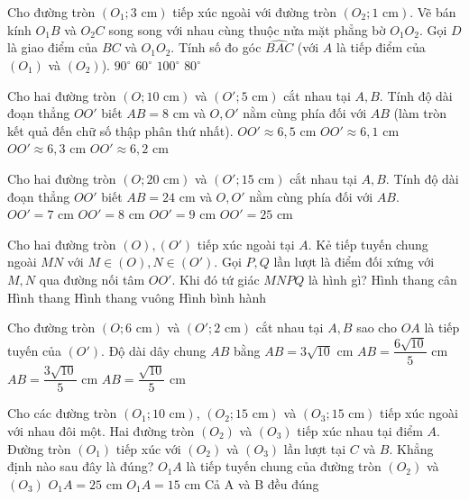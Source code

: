 \documentclass[11pt,a4paper]{article}
\begin{document}
\begin{ex}
Cho đường tròn $(O_1; 3\text{ cm})$ tiếp xúc ngoài với đường tròn $(O_2; 1\text{ cm})$. Vẽ bán kính $O_1B$ và $O_2C$ song song với nhau cùng thuộc nửa mặt phẳng bờ $O_1O_2$. Gọi $D$ là giao điểm của $BC$ và $O_1O_2$. Tính số đo góc $\widehat{BAC}$ (với $A$ là tiếp điểm của $(O_1)$ và $(O_2)$).
\choice
{\True $90^\circ$}
{$60^\circ$}
{$100^\circ$}
{$80^\circ$}
\loigiai{}
\end{ex}

\begin{ex}
Cho hai đường tròn $(O; 10\text{ cm})$ và $(O'; 5\text{ cm})$ cắt nhau tại $A, B$. Tính độ dài đoạn thẳng $OO'$ biết $AB = 8\text{ cm}$ và $O, O'$ nằm cùng phía đối với $AB$ (làm tròn kết quả đến chữ số thập phân thứ nhất).
\choice
{$OO' \approx 6{,}5\text{ cm}$}
{$OO' \approx 6{,}1\text{ cm}$}
{$OO' \approx 6{,}3\text{ cm}$}
{\True $OO' \approx 6{,}2\text{ cm}$}
\loigiai{}
\end{ex}

\begin{ex}
Cho hai đường tròn $(O; 20\text{ cm})$ và $(O'; 15\text{ cm})$ cắt nhau tại $A, B$. Tính độ dài đoạn thẳng $OO'$ biết $AB = 24\text{ cm}$ và $O, O'$ nằm cùng phía đối với $AB$.
\choice
{\True $OO' = 7\text{ cm}$}
{$OO' = 8\text{ cm}$}
{$OO' = 9\text{ cm}$}
{$OO' = 25\text{ cm}$}
\loigiai{}
\end{ex}

\newpage

\begin{ex}
Cho hai đường tròn $(O), (O')$ tiếp xúc ngoài tại $A$. Kẻ tiếp tuyến chung ngoài $MN$ với $M \in (O), N \in (O')$. Gọi $P, Q$ lần lượt là điểm đối xứng với $M, N$ qua đường nối tâm $OO'$. Khi đó tứ giác $MNPQ$ là hình gì?
\choice
{\True Hình thang cân}
{Hình thang}
{Hình thang vuông}
{Hình bình hành}
\loigiai{}
\end{ex}

\begin{ex}
Cho đường tròn $(O; 6\text{ cm})$ và $(O'; 2\text{ cm})$ cắt nhau tại $A, B$ sao cho $OA$ là tiếp tuyến của $(O')$. Độ dài dây chung $AB$ bằng
\choice
{$AB = 3\sqrt{10}\text{ cm}$}
{\True $AB = \dfrac{6\sqrt{10}}{5}\text{ cm}$}
{$AB = \dfrac{3\sqrt{10}}{5}\text{ cm}$}
{$AB = \dfrac{\sqrt{10}}{5}\text{ cm}$}
\loigiai{}
\end{ex}

\begin{ex}
Cho các đường tròn $(O_1; 10\text{ cm})$, $(O_2; 15\text{ cm})$ và $(O_3; 15\text{ cm})$ tiếp xúc ngoài với nhau đôi một. Hai đường tròn $(O_2)$ và $(O_3)$ tiếp xúc nhau tại điểm $A$. Đường tròn $(O_1)$ tiếp xúc với $(O_2)$ và $(O_3)$ lần lượt tại $C$ và $B$. Khẳng định nào sau đây là đúng?
\choice
{\True $O_1A$ là tiếp tuyến chung của đường tròn $(O_2)$ và $(O_3)$}
{$O_1A = 25\text{ cm}$}
{$O_1A = 15\text{ cm}$}
{Cả A và B đều đúng}
\loigiai{}
\end{ex}
\end{document}
